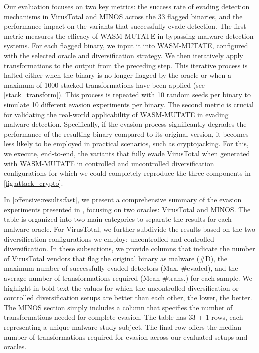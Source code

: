 Our evaluation focuses on two key metrics: the success rate of evading detection mechanisms in VirusTotal and MINOS across the 33 flagged binaries, and the performance impact on the variants that successfully evade detection.
The first metric measures the efficacy of WASM-MUTATE in bypassing malware detection systems. 
For each flagged binary, we input it into WASM-MUTATE, configured with the selected oracle and diversification strategy. 
We then iteratively apply transformations to the output from the preceding step. 
This iterative process is halted either when the binary is no longer flagged by the oracle or when a maximum of 1000 stacked transformations have been applied (see \autoref{stack_transform}).
This process is repeated with 10 random seeds per binary to simulate 10 different evasion experiments per binary.
The second metric is crucial for validating the real-world applicability of WASM-MUTATE in evading malware detection. 
Specifically, if the evasion process significantly degrades the performance of the resulting binary compared to its original version, it becomes less likely to be employed in practical scenarios, such as cryptojacking.
For this, we execute, end-to-end, the variants that fully evade VirusTotal when generated with WASM-MUTATE in controlled and uncontrolled diversification configurations for which we could completely reproduce the three components in \autoref{fig:attack_crypto}.


In \autoref{offensive:results:fast}, we present a comprehensive summary of the evasion experiments presented in \cite{EVASION}, focusing on two oracles: VirusTotal and MINOS\cite{MINOS}. 
The table is organized into two main categories to separate the results for each malware oracle. 
For VirusTotal, we further subdivide the results based on the two diversification configurations we employ: uncontrolled and controlled diversification. 
In these subsections, we provide columns that indicate the number of VirusTotal vendors that flag the original binary as malware (\#D), the maximum number of successfully evaded detectors (Max. \#evaded), and the average number of transformations required (Mean \#trans.) for each sample. 
We highlight in bold text the values for which the uncontrolled diversification or controlled diversification setups are better than each other, the lower, the better.
The MINOS section simply includes a column that specifies the number of transformations needed for complete evasion. 
The table has 33 + 1 rows, each representing a unique \wasm malware study subject. 
The final row offers the median number of transformations required for evasion across our evaluated setups and oracles. 

